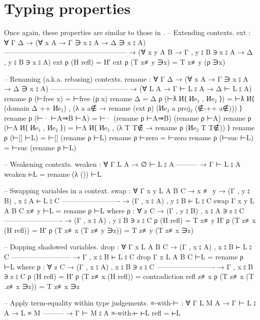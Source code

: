\documentclass[logo,bsc,singlespacing,parskip,online]{infthesis}
\renewenvironment{code}{\mintedcopy[breaklines,breaksymbolleft=\;]{agda}}{\endmintedcopy}
\begin{document}
\section{Typing properties}
Once again, these properties are similar to those in \citet{wadler_programming_2022}.
\begin{code}
  -- Extending contexts.
  ext : ∀ {Γ Δ}
    → (∀ {x A}     →        Γ ∋ x ⦂ A → Δ ∋ x ⦂ A)
      -----------------------------------------------------
    → (∀ {x y A B} → Γ , y ⦂ B ∋ x ⦂ A → Δ , y ⦂ B ∋ x ⦂ A)
  ext ρ (H refl) = H′
  ext ρ (T x≢y ∋x) = T x≢y (ρ ∋x)

  -- Renaming (a.k.a. rebasing) contexts.
  rename : ∀ {Γ Δ}
    → (∀ {x A} → Γ ∋ x ⦂ A → Δ ∋ x ⦂ A)
      ---------------------------------
    → (∀ {L A} → Γ ⊢ L ⦂ A → Δ ⊢ L ⦂ A)
  rename ρ (⊢free x) = ⊢free (ρ x)
  rename {Δ = Δ} ρ (⊢ƛ И⟨ Иe₁ , Иe₂ ⟩) = ⊢ƛ
    И⟨ (domain Δ ++ Иe₁)
    , (λ a {a∉} → rename (ext ρ) (Иe₂ a {proj₂ (∉-++ a∉)}))
    ⟩
  rename ρ (⊢· ⊢A⇒B ⊢A) = ⊢· (rename ρ ⊢A⇒B) (rename ρ ⊢A)
  rename ρ (⊢Λ И⟨ Иe₁ , Иe₂ ⟩) =
    ⊢Λ И⟨ Иe₁ , (λ T {T∉} → rename ρ (Иe₂ T {T∉})) ⟩
  rename ρ (⊢[] ⊢L) = ⊢[] (rename ρ ⊢L)
  rename ρ ⊢zero = ⊢zero
  rename ρ (⊢suc ⊢L) = ⊢suc (rename ρ ⊢L)

  -- Weakening contexts.
  weaken : ∀ {Γ L A}
    → ∅ ⊢ L ⦂ A
      ---------
    → Γ ⊢ L ⦂ A
  weaken ⊢L = rename (λ ()) ⊢L

  -- Swapping variables in a context.
  swap : ∀ {Γ x y L A B C}
    → x ≢ y
    → (Γ , y ⦂ B) , x ⦂ A ⊢ L ⦂ C
      -------------------------
    → (Γ , x ⦂ A) , y ⦂ B ⊢ L ⦂ C
  swap {Γ} {x} {y} {L} {A} {B} {C} x≢y ⊢L = rename ρ ⊢L
    where
      ρ : ∀ {z C}
        → (Γ , y ⦂ B) , x ⦂ A ∋ z ⦂ C
          -------------------------
        → (Γ , x ⦂ A) , y ⦂ B ∋ z ⦂ C
      ρ (H refl) = T x≢y H′
      ρ (T z≢x (H refl)) = H′
      ρ (T z≢x (T z≢y ∋z)) = T z≢y (T z≢x ∋z)

  -- Dopping shadowed variables.
  drop : ∀ {Γ x L A B C}
    → (Γ , x ⦂ A) , x ⦂ B ⊢ L ⦂ C
      --------------------------
    → Γ , x ⦂ B ⊢ L ⦂ C
  drop {Γ} {x} {L} {A} {B} {C} ⊢L = rename ρ ⊢L
    where
      ρ : ∀ {z C}
        → (Γ , x ⦂ A) , x ⦂ B ∋ z ⦂ C
          -------------------------
        → Γ , x ⦂ B ∋ z ⦂ C
      ρ (H refl) = H′
      ρ (T z≢x (H refl)) = contradiction refl z≢x
      ρ (T z≢x (T .z≢x ∋z)) = T z≢x ∋z

  -- Apply term-equality within type judgements.
  ≡-with-⊢ : ∀ {Γ L M A}
    → Γ ⊢ L ⦂ A
    → L ≡ M
      ---------
    → Γ ⊢ M ⦂ A
  ≡-with-⊢ ⊢L refl = ⊢L
\end{code}
\end{document}
